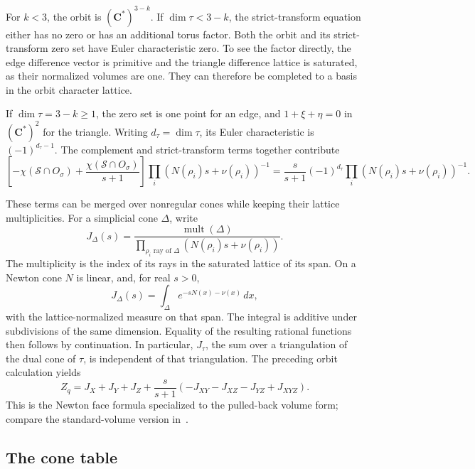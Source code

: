 \documentclass[11pt]{article}
\numberwithin{equation}{section}
\theoremstyle{definition}
\theoremstyle{remark}
\newcommand{\CC}{\mathbf C}
\DeclareMathOperator{\mult}{mult}
\begin{document}
For $k<3$, the orbit is $(\CC^*)^{3-k}$. If
$\dim\tau<3-k$, the strict-transform equation either has no
zero or has an additional torus factor. Both the orbit and its
strict-transform zero set have Euler characteristic zero.
To see the factor directly, the edge difference vector is
primitive and the triangle difference lattice is saturated,
as their normalized volumes are one. They can therefore be
completed to a basis in the orbit character lattice.

If $\dim\tau=3-k\ge1$, the zero set is one point for an edge,
and $1+\xi+\eta=0$ in $(\CC^*)^2$ for the triangle.
Writing $d_\tau=\dim\tau$, its Euler characteristic is
$(-1)^{d_\tau-1}$. The complement and strict-transform terms
together contribute
\[
 \left[-\chi(\mathcal S\cap O_\sigma)
      +\frac{\chi(\mathcal S\cap O_\sigma)}{s+1}\right]
      \prod_i(N(\rho_i)s+\nu(\rho_i))^{-1}
 =\frac{s}{s+1}(-1)^{d_\tau}
      \prod_i(N(\rho_i)s+\nu(\rho_i))^{-1}.
\]

These terms can be merged over nonregular cones while keeping
their lattice multiplicities. For a simplicial cone $\Delta$,
write
\[
 J_\Delta(s)=
   \frac{\mult(\Delta)}
        {\prod_{\rho_i\text{ ray of }\Delta}
                    (N(\rho_i)s+\nu(\rho_i))}.
\]
The multiplicity is the index of its rays in the saturated
lattice of its span. On a Newton cone $N$ is linear, and,
for real $s>0$,
\[
 J_\Delta(s)=\int_\Delta e^{-sN(x)-\nu(x)}\,dx,
\]
with the lattice-normalized measure on that span. The integral
is additive under subdivisions of the same dimension.
Equality of the resulting rational functions then follows
by continuation. In particular, $J_\tau$, the sum over a
triangulation of the dual cone of $\tau$, is independent of
that triangulation. The preceding orbit calculation yields
\begin{equation}\label{eq:weighted-newton}
 Z_q=J_X+J_Y+J_Z+
       \frac{s}{s+1}(-J_{XY}-J_{XZ}-J_{YZ}+J_{XYZ}).
\end{equation}
This is the Newton face formula specialized to the pulled-back
volume form; compare the standard-volume version
in~\cite[Th\'eor\`eme~5.3]{DL92}.

\subsection{The cone table}
\end{document}
